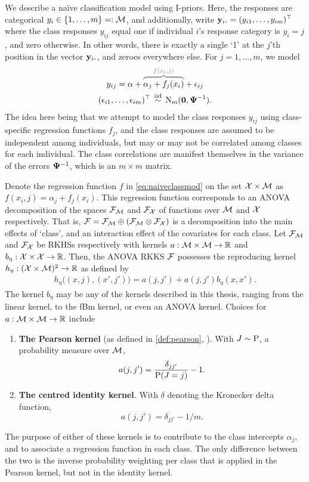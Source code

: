 We describe a naïve classification model using I-priors.
Here, the responses are categorical $y_i \in \{ 1,\dots,m \} =: {\mathcal M}$, and additionally, write $\by_{i \bigcdot} = (y_{i1},\dots,y_{im})^\top$ where the class responses $y_{ij}$ equal one if individual $i$'s response category is $y_i = j$, and zero otherwise.
In other words, there is exactly a single `1' at the $j$'th position in the vector $\by_{i \bigcdot}$, and zeroes everywhere else.
For $j=1,\dots,m$, we model 
\begin{equation}\label{eq:naiveclassmod}
  \begin{gathered}
    y_{ij} = \alpha + 
    \myoverbrace{\alpha_j + f_j(x_i)}{f(x_i,j)}
    + \epsilon_{ij}  \\
    (\epsilon_{i1},\dots,\epsilon_{im})^\top \iid \N_m(\bzero,\bPsi^{-1}).
  \end{gathered}
\end{equation}
The idea here being that we attempt to model the class responses $y_{ij}$ using class-specific regression functions $f_j$, and the class responses are assumed to be independent among individuals, but may or may not be correlated among classes for each individual.
The class correlations are manifest themselves in the variance of the errors ${\bm\Psi}^{-1}$, which is an $m\times m$ matrix.

Denote the regression function $f$ in \cref{eq:naiveclassmod} on the set ${\mathcal X}\times{\mathcal M}$ as $f(x_i,j) = \alpha_j + f_j(x_i)$.
This regression function corresponds to an ANOVA decomposition of the spaces ${\mathcal F}_{\mathcal M}$ and ${\mathcal F}_{\mathcal X}$ of functions over ${\mathcal M}$ and ${\mathcal X}$ respectively. 
That is, ${\mathcal F} = {\mathcal F}_{\mathcal M} \oplus ({\mathcal F}_{\mathcal M} \otimes {\mathcal F}_{\mathcal X})$ is a decomposition into the main effects of `class', and an interaction effect of the covariates for each class.
Let ${\mathcal F}_{\mathcal M}$ and ${\mathcal F}_{\mathcal X}$ be RKHSs respectively with kernels $a:{\mathcal M}\times{\mathcal M}\to\mathbb{R}$ and $b_\eta:{\mathcal X}\times{\mathcal X}\to\mathbb{R}$.
Then, the ANOVA RKKS ${\mathcal F}$ possesses the reproducing kernel $h_\eta:({\mathcal X} \times {\mathcal M})^2 \to \mathbb{R}$ as defined by
\begin{align}\label{eq:anovaclass}
  h_\eta\big( (x,j), (x',j') \big) = a(j,j') + a(j,j')b_\eta(x,x').  
\end{align}
The kernel $b_\eta$ may be any of the kernels described in this thesis, ranging from the linear kernel, to the fBm kernel, or even an ANOVA kernel.
Choices for $a:{\mathcal M} \times {\mathcal M} \to \mathbb{R}$ include 
\begin{enumerate}
  \item \textbf{The Pearson kernel} (as defined in \cref{def:pearson}, ). With $J\sim\operatorname{P}$, a probability measure over ${\mathcal M}$,
  \[
    a(j,j') = \frac{\delta_{jj'}}{\operatorname{P}(J=j)} - 1.
  \]
  \item \textbf{The centred identity kernel}. With $\delta$ denoting the Kronecker delta function,
  \[
    a(j,j') = \delta_{jj'} - 1 / m.
  \]
\end{enumerate}
The purpose of either of these kernels is to contribute to the class intercepts $\alpha_j$, and to associate a regression function in each class.
The only difference between the two is the inverse probability weighting per class that is applied in the Pearson kernel, but not in the identity kernel.

